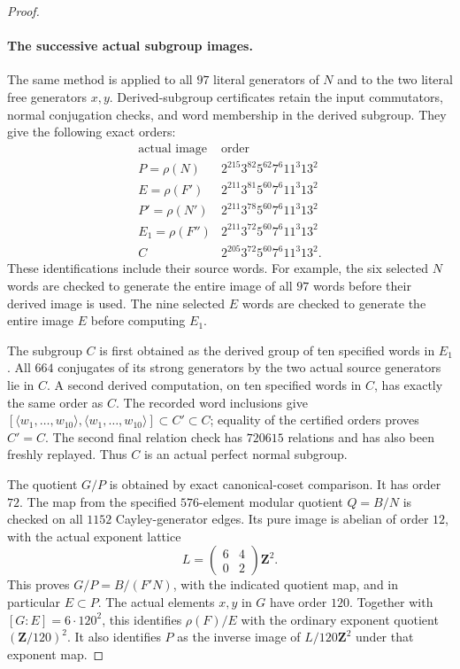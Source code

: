 \begin{proof}
\paragraph{The successive actual subgroup images.}
The same method is applied to all $97$ literal generators of $N$
and to the two literal free generators $x,y$.
Derived-subgroup certificates retain the input commutators,
normal conjugation checks, and word membership in the derived
subgroup.  They give the following exact orders:
\[
\begin{array}{c|l}
 \text{actual image}&\text{order}\\ \hline
 P=\rho(N)&2^{215}3^{82}5^{62}7^6 11^3 13^2\\
 E=\rho(F')&2^{211}3^{81}5^{60}7^6 11^3 13^2\\
 P'=\rho(N')&2^{211}3^{78}5^{60}7^6 11^3 13^2\\
 E_1=\rho(F'')&2^{211}3^{72}5^{60}7^6 11^3 13^2\\
 C&2^{205}3^{72}5^{60}7^6 11^3 13^2 .
\end{array}
 \tag{E.48.7}
\]
These identifications include their source words.
For example, the six selected $N$ words are checked to generate
the entire image of all $97$ words before their derived image
is used.
The nine selected $E$ words are checked to generate the entire
image $E$ before computing $E_1$.

The subgroup $C$ is first obtained as the derived group of ten
specified words in $E_1$.
All $664$ conjugates of its strong generators by the two actual
source generators lie in $C$.
A second derived computation, on ten specified words in $C$,
has exactly the same order as $C$.
The recorded word inclusions give
$[\langle w_1,\ldots,w_{10}\rangle,
  \langle w_1,\ldots,w_{10}\rangle]\subset C'\subset C$;
equality of the certified orders proves $C'=C$.
The second final relation check has $720615$ relations and has
also been freshly replayed.
Thus $C$ is an actual perfect normal subgroup.

The quotient $G/P$ is obtained by exact canonical-coset
comparison.  It has order $72$.
The map from the specified $576$-element modular quotient
$Q=B/N$ is checked on all $1152$ Cayley-generator edges.
Its pure image is abelian of order $12$, with the actual
exponent lattice
\[
            L=\begin{pmatrix}6&4\\0&2\end{pmatrix}\mathbf Z^2.
 \tag{E.48.8}
\]
This proves $G/P=B/(F'N)$, with the indicated quotient map,
and in particular $E\subset P$.
The actual elements $x,y$ in $G$ have order $120$.
Together with $[G:E]=6\cdot120^2$, this identifies
$\rho(F)/E$ with the ordinary exponent quotient
$(\mathbf Z/120)^2$.
It also identifies $P$ as the inverse image of
$L/120\mathbf Z^2$ under that exponent map.


\end{proof}
